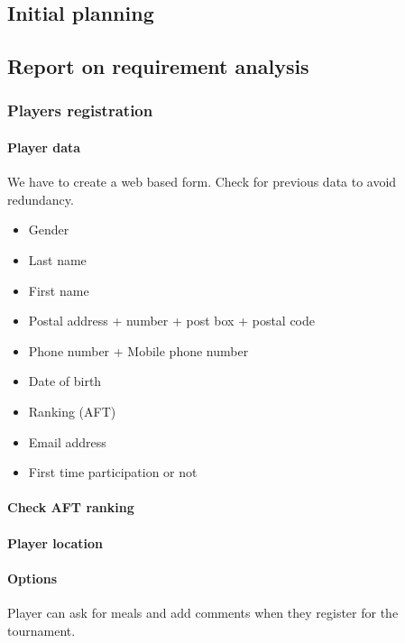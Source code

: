 \subsection{Initial planning}



\subsection{Report on requirement analysis}

\subsubsection{Players registration}

\paragraph{Player data}

We have to create a web based form. Check for previous data to avoid
redundancy. \newline

\begin{itemize}
    \item Gender
    \item Last name
    \item First name
    \item Postal address + number + post box + postal code
    \item Phone number + Mobile phone number
    \item Date of birth
    \item Ranking (AFT)
    \item Email address
    \item First time participation or not
\end{itemize}

\paragraph{Check AFT ranking}
\paragraph{Player location}
\paragraph{Options}

Player can ask for meals and add comments when they register for the
tournament.

